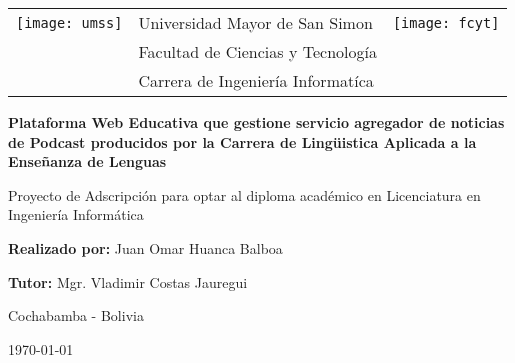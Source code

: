 \begin{titlepage}
	\begin{tabular}{llr}

	\texttt{[image: umss]} 	& \Large Universidad Mayor de San Simon  			& \texttt{[image: fcyt]} \\
										& Facultad de Ciencias y Tecnolog\'{i}a 	& \\
										& Carrera de Ingenier\'{i}a Informat\'{i}ca & \\
	\end{tabular}
	
	\begin{center}
		\normalsize
		
		\vspace{1.5cm}
		
		\textbf{Plataforma Web Educativa que gestione servicio agregador de noticias de Podcast producidos por la Carrera de Ling\"{u}istica Aplicada a la Enseñanza de Lenguas} \\
	
		\vspace{1.5cm}
	
		\small
		
		Proyecto de Adscripci\'{o}n para optar al diploma acad\'{e}mico en Licenciatura en Ingenier\'{i}a Inform\'{a}tica \\
		
		
		\vspace{1.5cm}
			
		\textbf{Realizado por:} Juan Omar Huanca Balboa \\
	
		\vspace{1.5cm}
	
		\textbf{Tutor:} Mgr. Vladimir Costas Jauregui \\
		
		\vspace{1.5cm}
		
		Cochabamba - Bolivia
	
		\vspace{1.5cm}
		
			
		\monthyeardate\today
		
	\end{center}

\end{titlepage}